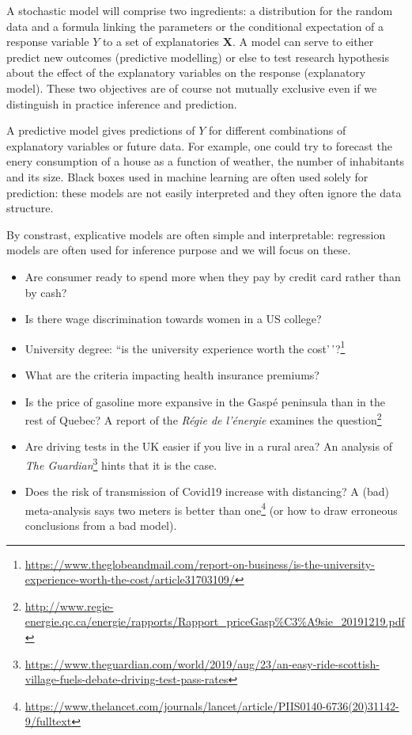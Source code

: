 \documentclass[
  11pt,
  letterpaper,
]{book}
\providecommand{\tightlist}{%
  \setlength{\itemsep}{0pt}\setlength{\parskip}{0pt}}
\renewcommand{\href}[2]{#2\footnote{\url{#1}}}
\theoremstyle{definition}
\theoremstyle{definition}
\theoremstyle{definition}
\theoremstyle{remark}
\begin{document}
A stochastic model will comprise two ingredients: a distribution for the random data and a formula linking the parameters or the conditional expectation of a response variable \(Y\) to a set of explanatories \(\mathbf{X}\). A model can serve to either predict new outcomes (predictive modelling) or else to test research hypothesis about the effect of the explanatory variables on the response (explanatory model). These two objectives are of course not mutually exclusive even if we distinguish in practice inference and prediction.

A predictive model gives predictions of \(Y\) for different combinations of explanatory variables or future data. For example, one could try to forecast the enery consumption of a house as a function of weather, the number of inhabitants and its size. Black boxes used in machine learning are often used solely for prediction: these models are not easily interpreted and they often ignore the data structure.

By constrast, explicative models are often simple and interpretable: regression models are often used for inference purpose and we will focus on these.

\begin{itemize}
\tightlist
\item
  Are consumer ready to spend more when they pay by credit card rather than by cash?
\item
  Is there wage discrimination towards women in a US college?
\item
  University degree: \href{https://www.theglobeandmail.com/report-on-business/is-the-university-experience-worth-the-cost/article31703109/}{``is the university experience worth the cost'\,'?}
\item
  What are the criteria impacting health insurance premiums?
\item
  Is the price of gasoline more expansive in the Gaspé peninsula than in the rest of Quebec? \href{http://www.regie-energie.qc.ca/energie/rapports/Rapport_priceGasp\%C3\%A9sie_20191219.pdf}{A report of the \emph{Régie de l'énergie} examines the question}
\item
  Are driving tests in the UK easier if you live in a rural area? \href{https://www.theguardian.com/world/2019/aug/23/an-easy-ride-scottish-village-fuels-debate-driving-test-pass-rates}{An analysis of \emph{The Guardian}} hints that it is the case.
\item
  Does the risk of transmission of Covid19 increase with distancing? \href{https://www.thelancet.com/journals/lancet/article/PIIS0140-6736(20)31142-9/fulltext}{A (bad) meta-analysis says two meters is better than one} (or how to draw erroneous conclusions from a bad model).
\end{itemize}
\end{document}
